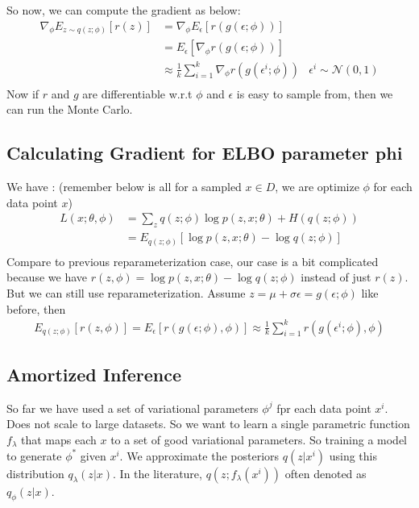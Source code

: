 So now, we can compute the gradient as below: 
    \begin{align*}
        \nabla_\phi  E_{z\sim q(z;\phi)}[r(z)] 
        & = \nabla_\phi E_\epsilon[r(g(\epsilon;\phi))]\\
        & = E_\epsilon[\nabla_\phi r(g(\epsilon;\phi))] \tag{Expectation does not depend on $\phi$}\\
        & \approx \frac{1}{k}\sum_{i=1}^k \nabla_\phi r(g(\epsilon^i ;\phi)) & \epsilon^i \sim \mathcal{N}(0,1) \tag{Monte Carlo by sampling $\epsilon$} \\
    \end{align*}
Now if $r$ and $g$ are differentiable w.r.t $\phi$ and $\epsilon$ is easy to sample from, then we can run the Monte Carlo.



\subsection{Calculating Gradient for ELBO parameter phi} 
We have : (remember below is all for a sampled $x\in D$, we are optimize $\phi$ for each data point $x$)
    \begin{align*}
        L(x;\theta,\phi) 
        & = \sum_z q(z;\phi) \log p(z,x;\theta) + H(q(z;\phi))\\
        & = E_{q(z;\phi)}[\log p(z,x;\theta) - \log q(z;\phi)] \\
    \end{align*}
Compare to previous reparameterization case, our case is a bit complicated because we have $r(z,\phi) = \log p(z,x;\theta) - \log q(z;\phi)$ instead of just $r(z)$. But we can still use reparameterization. Assume $z = \mu + \sigma \epsilon = g(\epsilon; \phi)$ like before, then 
    \begin{align*}
    E_{q(z;\phi)}[r(z,\phi)] = E_\epsilon[r(g(\epsilon;\phi),\phi)] \approx \frac{1}{k}\sum_{i=1}^k r(g(\epsilon^i ;\phi),\phi)
    \end{align*}


\subsection{Amortized Inference} 
So far we have used a set of variational parameters $\phi^j$ fpr each data point $x^i$. Does not scale to large datasets. So we want to learn a single parametric function $f_\lambda$ that maps each $x$ to a set of good variational parameters. So training a model to generate $\phi^*$ given $x^i$. We approximate the posteriors $q(z|x^i)$ using this distribution $q_\lambda(z|x)$. In the literature, $q(z; f_\lambda(x^i))$ often denoted as $q_\phi(z|x)$. 

